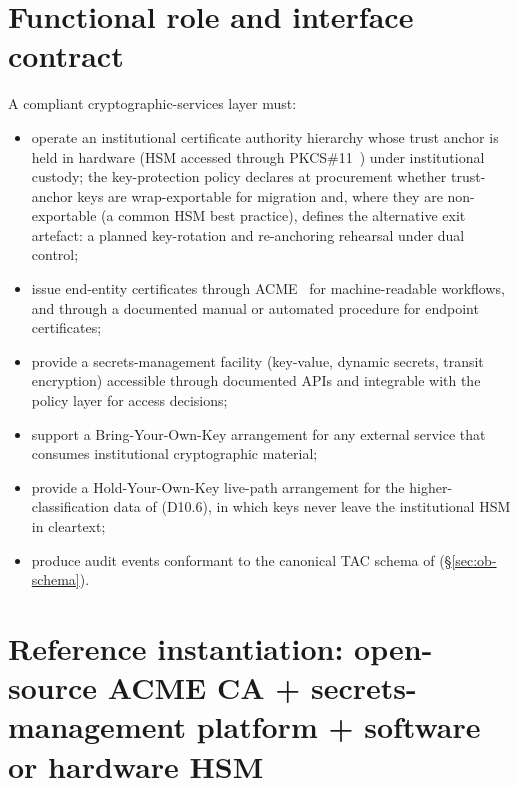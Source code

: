 \section{Functional role and interface contract}
\label{sec:cr-contract}

\begin{contractbox}
\noindent A compliant cryptographic-services layer must:

\begin{itemize}[leftmargin=1.5em,nosep]
  \item operate an institutional certificate authority hierarchy
    whose trust anchor is held in hardware (HSM accessed through
    PKCS\#11~\cite{pkcs11-oasis}) under institutional custody; the
    key-protection policy declares at procurement whether
    trust-anchor keys are wrap-exportable for migration and, where
    they are non-exportable (a common HSM best practice), defines
    the alternative exit artefact: a planned key-rotation and
    re-anchoring rehearsal under dual control;
  \item issue end-entity certificates through
    ACME~\cite{rfc-8555-acme} for machine-readable workflows, and
    through a documented manual or automated procedure for endpoint
    certificates;
  \item provide a secrets-management facility (key-value, dynamic
    secrets, transit encryption) accessible through documented APIs
    and integrable with the policy layer for access decisions;
  \item support a Bring-Your-Own-Key arrangement for any external
    service that consumes institutional cryptographic material;
  \item provide a Hold-Your-Own-Key live-path arrangement for the
    higher-classification data of  (D10.6),
    in which keys never leave the institutional HSM in cleartext;
  \item produce audit events conformant to the canonical TAC
    schema of  (\S\ref{sec:ob-schema}).
\end{itemize}
\end{contractbox}

\section{Reference instantiation: open-source ACME CA + secrets-management platform + software or hardware HSM}
\label{sec:cr-reference}

